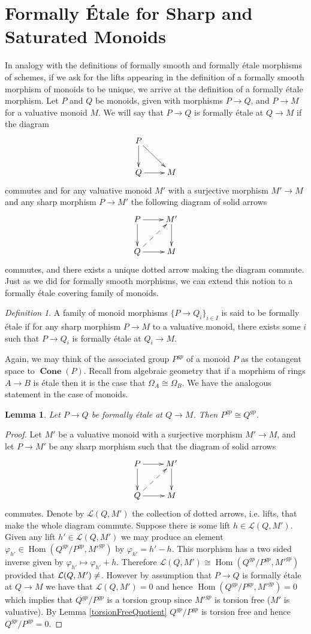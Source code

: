 \documentclass[12pt]{amsart}
\numberwithin{equation}{section}
\theoremstyle{plain}
\newtheorem{lem}[equation]{Lemma}
\theoremstyle{remark}
\newtheorem{defn}[equation]{Definition}
\DeclareMathOperator{\Hom}{Hom}
\DeclareMathOperator{\Cone}{\textbf{Cone}}
\newcommand{\calL}{\mathcal{L}}
\begin{document}
\section{Formally \'Etale for Sharp and Saturated Monoids}
	In analogy with the definitions of formally smooth and formally \'etale morphisms of schemes, if we ask for the lifts appearing in the definition of a formally smooth morphism of monoids to be unique, we arrive at the definition of a formally \'etale morphism. Let $P$ and $Q$ be monoids, given with morphisms $P\to Q$, and $P\to M$ for a valuative monoid $M$. We will say that $P\to Q$ is formally \'etale at $Q\to M$ if the diagram
$$\xymatrix{
	P\ar[d]\ar[dr] & \\
	Q\ar[r] & M\\
	}$$
commutes and for any valuative monoid $M'$ with a surjective morphism $M'\to M$ and any sharp morphism $P\to M'$ the following diagram of solid arrows
$$\xymatrix{
	P\ar[d]\ar[r] & M'\ar[d]\\
	Q\ar[r]\ar@{-->}[ur] & M}$$
commutes, and there exists a unique dotted arrow making the diagram commute. Just as we did for formally smooth morphisms, we can extend this notion to a formally \'etale covering family of monoids.
\begin{defn}
	A family of monoid morphisms $\{P\to Q_i\}_{i\in I}$ is said to be formally \'etale if for any sharp morphism $P\to M$ to a valuative monoid, there exists some $i$ such that $P\to Q_i$ is formally \'etale at $Q_i\to M$.
\end{defn}
Again, we may think of the associated group $P^{gp}$ of a monoid $P$ as the cotangent space to $\Cone(P)$. Recall from algebraic geometry that if a moprhism of rings $A\to B$ is \'etale then it is the case that $\Omega_A\cong \Omega_B$. We have the analogous statement in the case of monoids.
\begin{lem}
	Let $P\to Q$ be formally \'etale at $Q\to M$. Then $P^{gp}\cong Q^{gp}$.
\end{lem}
\begin{proof}
	Let $M'$ be a valuative monoid with a surjective morphism $M'\to M$, and let $P\to M'$ be any sharp morphism such that the diagram of solid arrows
$$\xymatrix{
	P\ar[r]\ar[d] & M'\ar[d]\\
	Q\ar[r]\ar@{-->}[ur] & M}$$
commutes. Denote by $\calL(Q,M')$ the collection of dotted arrows, i.e. lifts, that make the whole diagram commute. Suppose there is some lift $h\in \calL(Q,M')$. Given any lift $h'\in \calL(Q,M')$ we may produce an element $\varphi_{h'}\in\Hom(Q^{gp}/P^{gp}, M'^{gp})$ by $\varphi_{h'} = h'-h$. This morphism has a two sided inverse given by $\varphi_{h'} \mapsto \varphi_{h'} + h$. Therefore $\calL(Q, M') \cong \Hom(Q^{gp}/P^{gp}, M'^{gp})$ provided that $\calL(Q, M')\neq\empty$. However by assumption that $P\to Q$ is formally \'etale at $Q\to M$ we have that $\calL(Q, M') = 0$ and hence $\Hom(Q^{gp}/P^{gp}, M'^{gp}) = 0$ which implies that $Q^{gp}/P^{gp}$ is a torsion group since $M'^{gp}$ is torsion free ($M'$ is valuative). By Lemma \eqref{torsionFreeQuotient} $Q^{gp}/P^{gp}$ is torsion free and hence $Q^{gp}/P^{gp} = 0$.
\end{proof}
\end{document}
